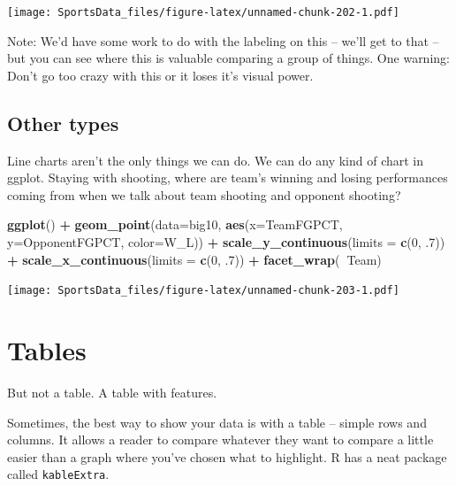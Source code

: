 \documentclass[
]{book}
\newenvironment{Shaded}{\begin{snugshade}}{\end{snugshade}}
\newcommand{\DataTypeTok}[1]{\textcolor[rgb]{0.13,0.29,0.53}{#1}}
\newcommand{\DecValTok}[1]{\textcolor[rgb]{0.00,0.00,0.81}{#1}}
\newcommand{\FloatTok}[1]{\textcolor[rgb]{0.00,0.00,0.81}{#1}}
\newcommand{\KeywordTok}[1]{\textcolor[rgb]{0.13,0.29,0.53}{\textbf{#1}}}
\newcommand{\NormalTok}[1]{#1}
\newcommand{\OperatorTok}[1]{\textcolor[rgb]{0.81,0.36,0.00}{\textbf{#1}}}
\newcommand{\StringTok}[1]{\textcolor[rgb]{0.31,0.60,0.02}{#1}}
\begin{document}
\texttt{[image: SportsData\_files/figure-latex/unnamed-chunk-202-1.pdf]}

Note: We'd have some work to do with the labeling on this -- we'll get to that -- but you can see where this is valuable comparing a group of things. One warning: Don't go too crazy with this or it loses it's visual power.

\hypertarget{other-types}{%
\section{Other types}\label{other-types}}

Line charts aren't the only things we can do. We can do any kind of chart in ggplot. Staying with shooting, where are team's winning and losing performances coming from when we talk about team shooting and opponent shooting?

\begin{Shaded}
\begin{Highlighting}[]
\KeywordTok{ggplot}\NormalTok{() }\OperatorTok{+}\StringTok{ }\KeywordTok{geom_point}\NormalTok{(}\DataTypeTok{data=}\NormalTok{big10, }\KeywordTok{aes}\NormalTok{(}\DataTypeTok{x=}\NormalTok{TeamFGPCT, }\DataTypeTok{y=}\NormalTok{OpponentFGPCT, }\DataTypeTok{color=}\NormalTok{W_L)) }\OperatorTok{+}\StringTok{ }\KeywordTok{scale_y_continuous}\NormalTok{(}\DataTypeTok{limits =} \KeywordTok{c}\NormalTok{(}\DecValTok{0}\NormalTok{, }\FloatTok{.7}\NormalTok{)) }\OperatorTok{+}\StringTok{ }\KeywordTok{scale_x_continuous}\NormalTok{(}\DataTypeTok{limits =} \KeywordTok{c}\NormalTok{(}\DecValTok{0}\NormalTok{, }\FloatTok{.7}\NormalTok{)) }\OperatorTok{+}\StringTok{ }\KeywordTok{facet_wrap}\NormalTok{(}\OperatorTok{~}\NormalTok{Team)}
\end{Highlighting}
\end{Shaded}

\texttt{[image: SportsData\_files/figure-latex/unnamed-chunk-203-1.pdf]}

\hypertarget{tables}{%
\chapter{Tables}\label{tables}}

But not a table. A table with features.

Sometimes, the best way to show your data is with a table -- simple rows and columns. It allows a reader to compare whatever they want to compare a little easier than a graph where you've chosen what to highlight. R has a neat package called \texttt{kableExtra}.
\end{document}
